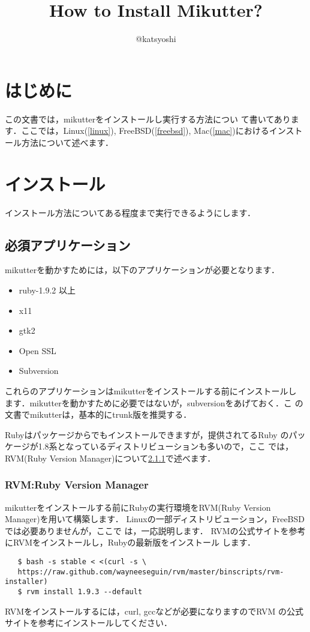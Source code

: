 \documentclass{jsarticle}
\title{How to Install Mikutter?}
\author{@katsyoshi}
\date{}
\begin{document}
\maketitle
 \section{はじめに}
 この文書では，mikutter\cite{mikutter}をインストールし実行する方法につい
 て書いてあります．ここでは，Linux(\ref{linux}), FreeBSD(\ref{freebsd}),
 Mac(\ref{mac})におけるインストール方法について述べます．
 
 \section{インストール} \label{install}
 インストール方法についてある程度まで実行できるようにします．
  \subsection{必須アプリケーション}
  mikutterを動かすためには，以下のアプリケーションが必要となります\cite{readme}．
  \begin{itemize}
   \item ruby-1.9.2 以上
   \item x11
   \item gtk2
   \item Open SSL
   \item Subversion
  \end{itemize}
  これらのアプリケーションはmikutterをインストールする前にインストールし
  ます．mikutterを動かすために必要ではないが，subversionをあげておく．こ
  の文書でmikutterは，基本的にtrunk版を推奨する．

  Rubyはパッケージからでもインストールできますが，提供されてるRuby
  のパッケージが1.8系となっているディストリビューションも多いので，ここ
  では，RVM(Ruby Version Manager)について\ref{RVM}で述べます．
  
  \subsubsection{RVM:Ruby Version Manager} \label{RVM}
  mikutterをインストールする前にRubyの実行環境をRVM(Ruby Version
  Manager)\cite{rvm}を用いて構築します．
  Linuxの一部ディストリビューション，FreeBSDでは必要ありませんが，ここで
  は，一応説明します．
  RVMの公式サイトを参考にRVMをインストールし，Rubyの最新版をインストール
  します．
  \begin{lstlisting}
   $ bash -s stable < <(curl -s \
   https://raw.github.com/wayneeseguin/rvm/master/binscripts/rvm-installer)
   $ rvm install 1.9.3 --default
  \end{lstlisting}
  RVMをインストールするには，curl, gccなどが必要になりますのでRVM
  の公式サイトを参考にインストールしてください．
  
\end{document}
